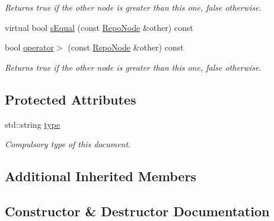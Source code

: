 \begin{DoxyCompactItemize}
\begin{DoxyCompactList}\small\item\em Returns true if the other node is greater than this one, false otherwise. \end{DoxyCompactList}\item 
virtual bool \hyperlink{classrepo_1_1core_1_1model_1_1_repo_node_a7c98830a876ee6516587a8f07c7015a5}{s\+Equal} (const \hyperlink{classrepo_1_1core_1_1model_1_1_repo_node}{Repo\+Node} \&other) const 
\item 
\hypertarget{classrepo_1_1core_1_1model_1_1_repo_node_a79bf797a38615a8a01013f27b82d1075}{}bool \hyperlink{classrepo_1_1core_1_1model_1_1_repo_node_a79bf797a38615a8a01013f27b82d1075}{operator$>$} (const \hyperlink{classrepo_1_1core_1_1model_1_1_repo_node}{Repo\+Node} \&other) const \label{classrepo_1_1core_1_1model_1_1_repo_node_a79bf797a38615a8a01013f27b82d1075}

\begin{DoxyCompactList}\small\item\em Returns true if the other node is greater than this one, false otherwise. \end{DoxyCompactList}\end{DoxyCompactItemize}
\subsection*{Protected Attributes}
\begin{DoxyCompactItemize}
\item 
\hypertarget{classrepo_1_1core_1_1model_1_1_repo_node_a72eab96d654f3f62db12bd7dc3042b7f}{}std\+::string \hyperlink{classrepo_1_1core_1_1model_1_1_repo_node_a72eab96d654f3f62db12bd7dc3042b7f}{type}\label{classrepo_1_1core_1_1model_1_1_repo_node_a72eab96d654f3f62db12bd7dc3042b7f}

\begin{DoxyCompactList}\small\item\em Compulsory type of this document. \end{DoxyCompactList}\end{DoxyCompactItemize}
\subsection*{Additional Inherited Members}


\subsection{Constructor \& Destructor Documentation}
\hypertarget{classrepo_1_1core_1_1model_1_1_repo_node_abec87b9a166ec42041ceced9315acee1}{}
